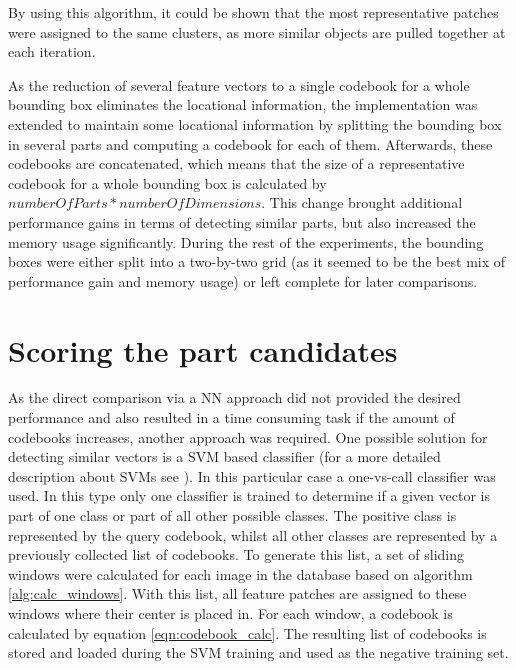 By using this algorithm, it could be shown that the most representative patches were assigned to the same clusters, as more similar objects are pulled together at each iteration.

\par
As the reduction of several feature vectors to a single codebook for a whole bounding box eliminates the locational information, the implementation was extended to maintain some locational information by splitting the bounding box in several parts and computing a codebook for each of them. Afterwards, these codebooks are concatenated, which means that the size of a representative codebook for a whole bounding box is calculated by $numberOfParts * numberOfDimensions$. This change brought additional performance gains in terms of detecting similar parts, but also increased the memory usage significantly. During the rest of the experiments, the bounding boxes were either split into a two-by-two grid (as it seemed to be the best mix of performance gain and memory usage) or left complete for later comparisons.

\section{Scoring the part candidates}

As the direct comparison via a \ac{NN} approach did not provided the desired performance and also resulted in a time consuming task if the amount of codebooks increases, another approach was required. One possible solution for detecting similar vectors is a \ac{SVM} based classifier (for a more detailed description about \acp{SVM} see ). In this particular case a one-vs-call classifier was used. In this type only one classifier is trained to determine if a given vector is part of one class or part of all other possible classes. The positive class is represented by the query codebook, whilst all other classes are represented by a previously collected list of codebooks. To generate this list, a set of sliding windows were calculated for each image in the database based on algorithm \ref{alg:calc_windows}. With this list, all feature patches are assigned to these windows where their center is placed in. For each window, a codebook is calculated by equation \ref{eqn:codebook_calc}. The resulting list of codebooks is stored and loaded during the \ac{SVM} training and used as the negative training set.

